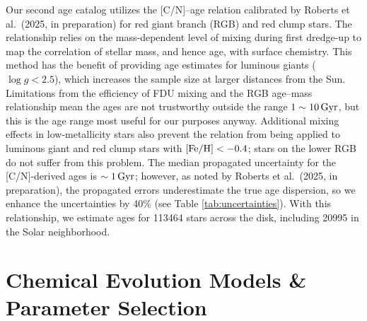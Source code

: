 \documentclass[twocolumn,twocolappendix,linenumbers]{aastex631}
\newcommand{\todo}[1]{{\color{red}#1}}
\newcommand{\mathFeH}{{\rm [Fe/H]}}
\newcommand{\Gyr}{\,{\rm Gyr}}
\begin{document}

Our second age catalog utilizes the [C/N]--age relation calibrated by \todo{Roberts et al.\ (2025, in preparation)} for red giant branch (RGB) and red clump stars. The relationship relies on the mass-dependent level of mixing during first dredge-up \citep[FDU;][]{iben_stellar_1967} to map the correlation of stellar mass, and hence age, with surface chemistry. This method has the benefit of providing age estimates for luminous giants ($\log g<2.5$), which increases the sample size at larger distances from the Sun. Limitations from the efficiency of FDU mixing and the RGB age--mass relationship mean the ages are not trustworthy outside the range $1\sim10\Gyr$, but this is the age range most useful for our purposes anyway. Additional mixing effects in low-metallicity stars %
also prevent the relation from being applied to luminous giant and red clump stars with $\mathFeH<-0.4$; stars on the lower RGB do not suffer from this problem. The median propagated uncertainty for the [C/N]-derived ages is $\sim1\Gyr$; however, as noted by \todo{Roberts et al.\ (2025, in preparation)}, the propagated errors underestimate the true age dispersion, so we enhance the uncertainties by 40\% (see Table \ref{tab:uncertainties}). With this relationship, we estimate ages for \num{113464} stars across the disk, including \num{20995} in the Solar neighborhood.

\section{Chemical Evolution Models \& Parameter Selection}
\label{sec:methods}
\end{document}
